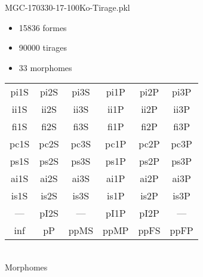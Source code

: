 MGC-170330-17-100Ko-Tirage.pkl
\begin{itemize}
\item 15836 formes
\item 90000 tirages
\item 33 morphomes
\end{itemize}
\begin{center}
\begin{tabular}{cccccc}
\hline
\cellcolor{white}pi1S & \cellcolor{orange}pi2S & \cellcolor{orange}pi3S & \cellcolor{white}pi1P & \cellcolor{white}pi2P & \cellcolor{white}pi3P\\
\cellcolor{brown}ii1S & \cellcolor{brown}ii2S & \cellcolor{brown}ii3S & \cellcolor{white}ii1P & \cellcolor{white}ii2P & \cellcolor{brown}ii3P\\
\cellcolor{yellow}fi1S & \cellcolor{lime}fi2S & \cellcolor{lime}fi3S & \cellcolor{green}fi1P & \cellcolor{white}fi2P & \cellcolor{green}fi3P\\
\cellcolor{yellow}pc1S & \cellcolor{yellow}pc2S & \cellcolor{yellow}pc3S & \cellcolor{white}pc1P & \cellcolor{white}pc2P & \cellcolor{yellow}pc3P\\
\cellcolor{teal}ps1S & \cellcolor{teal}ps2S & \cellcolor{teal}ps3S & \cellcolor{white}ps1P & \cellcolor{white}ps2P & \cellcolor{teal}ps3P\\
\cellcolor{white}ai1S & \cellcolor{lightgray}ai2S & \cellcolor{lightgray}ai3S & \cellcolor{white}ai1P & \cellcolor{blue}ai2P & \cellcolor{white}ai3P\\
\cellcolor{pink}is1S & \cellcolor{white}is2S & \cellcolor{lightgray}is3S & \cellcolor{white}is1P & \cellcolor{black}is2P & \cellcolor{pink}is3P\\
--- & \cellcolor{white}pI2S & --- & \cellcolor{white}pI1P & \cellcolor{blue}pI2P & ---\\
\cellcolor{white}inf & \cellcolor{white}pP & \cellcolor{white}ppMS & \cellcolor{white}ppMP & \cellcolor{white}ppFS & \cellcolor{white}ppFP\\
\hline
\end{tabular}\\
Morphomes
\end{center}
\bigskip

